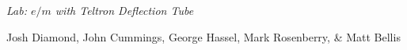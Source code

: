 {\LARGE {\em \noindent Lab: $e/m$ with Teltron Deflection Tube}}

\large{\noindent Josh Diamond,  John Cummings, George Hassel, Mark Rosenberry, \& Matt Bellis}

